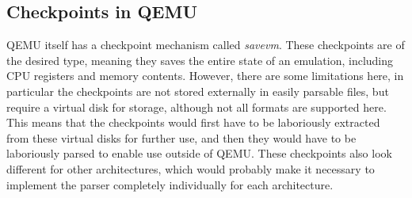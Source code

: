 \subsection{Checkpoints in QEMU}
QEMU itself has a checkpoint mechanism called \emph{savevm}.
These checkpoints are of the desired type, meaning they saves the entire state of an emulation,
including CPU registers and memory contents.
However, there are some limitations here, in particular the checkpoints are not stored externally in easily parsable files,
but require a virtual disk for storage, although not all formats are supported here.
This means that the checkpoints would first have to be laboriously extracted from these virtual disks for further use,
and then they would have to be laboriously parsed to enable use outside of QEMU.
These checkpoints also look different for other architectures, which would probably make it necessary
to implement the parser completely individually for each architecture.